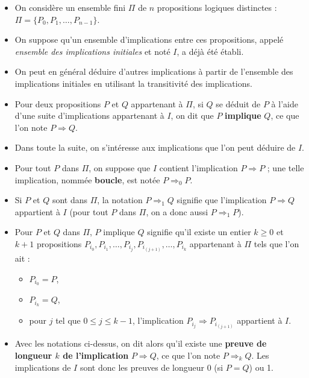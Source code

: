 \begin{itemize}
    \item On considère un ensemble fini $\Pi$ de $n$ propositions logiques distinctes : $\Pi = \{P_{0}, P_{1}, \ldots, P_{n-1}\}$.
    \item On suppose qu'un ensemble d'implications entre ces propositions, appelé {\it ensemble des implications initiales} et noté $I$, a déjà été établi.
    \item On peut en général déduire d'autres implications à partir de l'ensemble des implications initiales en utilisant la transitivité des implications.
    \item Pour deux propositions $P$ et $Q$ appartenant à $\Pi$, si $Q$ se déduit de $P$ à l'aide d'une suite d'implications appartenant à $I$, on dit que $P$ {\bf implique} $Q$, ce que l'on note $P \Rightarrow Q$.
    \item  Dans toute la suite, on s'intéresse aux implications que l'on peut déduire de $I$.
    \item Pour tout $P$ dans $\Pi$, on suppose que $I$ contient l'implication $P \Rightarrow P$ ; une telle implication, nommée {\bf boucle}, est notée $P \Rightarrow_{0} P$.
    \item Si $P$ et $Q$ sont dans $\Pi$, la notation $P \Rightarrow_{1} Q$ signifie que l'implication $P \Rightarrow Q$ appartient à $I$ (pour tout $P$ dans $\Pi$, on a donc aussi $P \Rightarrow_{1} P$).
    \item Pour $P$ et $Q$ dans $\Pi$, $P$ implique $Q$ signifie qu'il existe un entier $k \ge  0$ et $k + 1$ propositions $P_{i_{0}}, P_{i_{1}}, \ldots, P_{i_{j}}, P_{i_{(j + 1)}}, \ldots, P_{i_{k}}$ appartenant à $\Pi$ tels que l'on ait :
        \begin{itemize}
        \item $P_{i_{0}}=P$,
        \item $P_{i_{k}}=Q$,
        \item pour $j$ tel que $0 \le  j \le  k - 1$, l'implication $P_{i_{j}} \Rightarrow P_{i_{(j + 1)}}$ appartient à $I$.
        \end{itemize}
   \item Avec les notations ci-dessus, on dit alors qu'il existe une {\bf preuve de longueur $k$ de l'implication} $P \Rightarrow Q$, ce que l'on note $P \Rightarrow_{k} Q$. Les implications de $I$ sont donc les preuves de longueur 0 (si $P = Q$) ou 1.
\end{itemize}

\newpage

